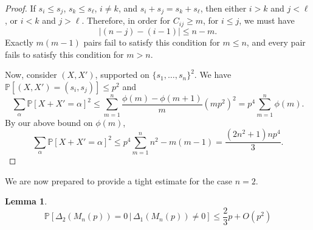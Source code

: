 \documentclass[reqno]{amsart}
\numberwithin{equation}{section}
\newtheorem{lemma}[theorem]{Lemma}
\begin{document}
\begin{proof}
If $s_i \le s_j$, $s_{k} \le s_\ell$, $i \ne k$, and $s_i + s_j = s_k + s_{\ell}$, then either $i>k$ and $j<\ell$, or $i <k$ and $j > \ell$. Therefore, in order for $C_{ij} \ge m$, for $i\le j$, we must have
\[ \left| (n - j) - (i-1) \right| \le n -m. \]
Exactly $m(m-1)$ pairs fail to satisfy this condition for $m \le n$, and every pair fails to satisfy this condition for $m >n$. 

Now, consider $(X,X')$, supported on $\{s_1,\ldots,s_n\}^2$. We have $\mathbb{P}[(X,X') = (s_i,s_j)]\le p^2$ and
\[\sum_{\alpha} \mathbb{P}\left[ X + X' = \alpha \right]^2 \le \sum_{m=1}^n \frac{\phi(m)-\phi(m+1)}{m}\left(m p^2\right)^2 = p^4 \sum_{m=1}^n \phi(m). \]
By our above bound on $\phi(m)$,
\[\sum_{\alpha} \mathbb{P}\left[ X + X' = \alpha \right]^2 \le p^4 \sum_{m=1}^n n^2 - m(m-1)=\frac{(2n^2+1)n p^4}{3}.\]
\end{proof}

We are now prepared to provide a tight estimate for the case $n = 2$.

\begin{lemma}\label{lm:p_small_2}
\[\mathbb{P}\left[ \Delta_2(M_n(p)) = 0 \, | \, \Delta_1(M_n(p)) \ne 0 \right] \le \frac{2}{3} p +O(p^2)\]
\end{lemma}
\end{document}
